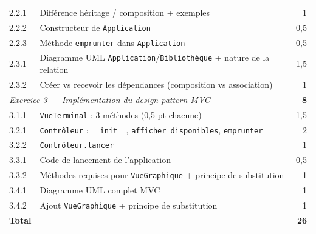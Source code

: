 \documentclass{article}
\theoremstyle{exostyle}
\theoremstyle{partiestyle}
\theoremstyle{questionstyle}
\begin{document}
\begin{center}
\begin{tabular}{llr}
2.2.1 & Différence héritage / composition + exemples & 1 \\
2.2.2 & Constructeur de \texttt{Application} & 0,5 \\
2.2.3 & Méthode \texttt{emprunter} dans \texttt{Application} & 0,5 \\
2.3.1 & Diagramme UML \texttt{Application}/\texttt{Bibliothèque} + nature de la relation & 1,5 \\
2.3.2 & Créer vs recevoir les dépendances (composition vs association) & 1 \\
\midrule
\multicolumn{2}{l}{\textit{Exercice 3 — Implémentation du design pattern MVC}} & \textbf{8} \\
\midrule
3.1.1 & \texttt{VueTerminal} : 3 méthodes (0,5 pt chacune) & 1,5 \\
3.2.1 & \texttt{Contrôleur} : \texttt{\_\_init\_\_}, \texttt{afficher\_disponibles}, \texttt{emprunter} & 2 \\
3.2.2 & \texttt{Contrôleur.lancer} & 1 \\
3.3.1 & Code de lancement de l'application & 0,5 \\
3.3.2 & Méthodes requises pour \texttt{VueGraphique} + principe de substitution & 1 \\
3.4.1 & Diagramme UML complet MVC & 1 \\
3.4.2 & Ajout \texttt{VueGraphique} + principe de substitution & 1 \\
\bottomrule
\textbf{Total} & & \textbf{26} \\
\bottomrule
\end{tabular}
\end{center}

\clearpage
\end{document}
